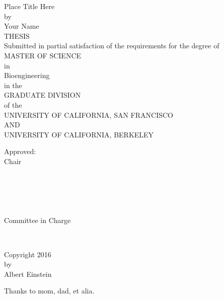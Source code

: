 \documentclass{uscf}
\begin{document}
\frontmatter

\thispagestyle{empty}
\begin{centering}
  Place Title Here\\
  by\\Your Name\\
  THESIS\\Submitted in partial satisfaction of the requirements
  for the degree of\\MASTER OF SCIENCE\\
  in\\Bioengineering\\
  in the\\GRADUATE DIVISION\\
  of the\\UNIVERSITY OF CALIFORNIA, SAN FRANCISCO\\
          AND\\UNIVERSITY OF CALIFORNIA, BERKELEY\\
  \vspace{1in}
  \begin{minipage}{0.7\linewidth}
    \hspace{-2em}Approved:\\
    \null\hfill Chair\\[-.5em]
    \null\dotfill\\
    \null\dotfill\\
    \null\dotfill\\
    \null\dotfill\\[1em]
    \null\dotfill\\
    \null\hfill Committee in Charge\\
  \end{minipage}\\
\end{centering}
% 

\clearpage
\vspace*{2in}
\begin{centering}
  Copyright 2016\\by\\Albert Einstein\\
\end{centering}

\clearpage
\vspace*{1in}
\hfill
\begin{minipage}{.5\linewidth}
  Thanks to mom, dad, et alia.
\end{minipage}
\end{document}
